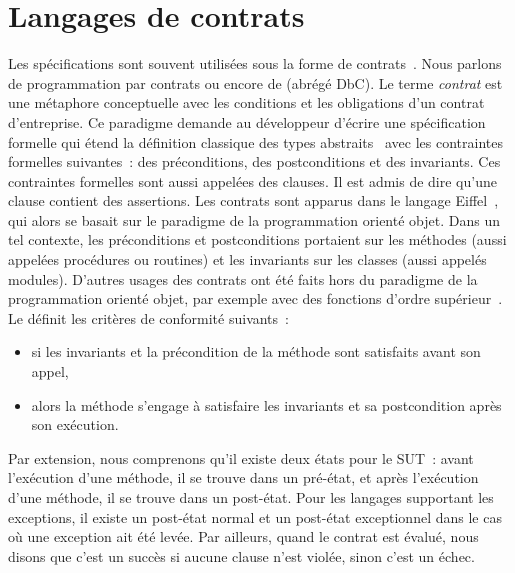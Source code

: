 \section{Langages de contrats}
\label{section:sota:bisl}

Les spécifications sont souvent utilisées sous la forme de {\strong
contrats}~. Nous parlons de programmation par contrats
ou encore de  (abrégé DbC). Le terme {\em contrat}
est une métaphore conceptuelle avec les conditions et les obligations d'un
contrat d'entreprise. Ce paradigme demande au développeur d'écrire une
spécification formelle qui étend la définition classique des types
abstraits~ avec les contraintes formelles suivantes~: des
{\strong préconditions}, des {\strong postconditions} et des {\strong
invariants}. Ces contraintes formelles sont aussi appelées des {\strong
clauses}. Il est admis de dire qu'une clause contient des {\strong assertions}.
Les contrats sont apparus dans le langage Eiffel~, qui alors se
basait sur le paradigme de la programmation orienté objet. Dans un tel contexte,
les préconditions et postconditions portaient sur les méthodes (aussi appelées
procédures ou routines) et les invariants sur les classes (aussi appelés
modules). D'autres usages des contrats ont été faits hors du paradigme de la
programmation orienté objet, par exemple avec des fonctions d'ordre
supérieur~. Le  définit les
critères de conformité suivants~:

\begin{itemize}

\item si les invariants et la précondition de la méthode sont satisfaits avant
son appel,

\item alors la méthode s'engage à satisfaire les invariants et sa postcondition
après son exécution.

\end{itemize}

Par extension, nous comprenons qu'il existe deux états pour le SUT~: avant
l'exécution d'une méthode, il se trouve dans un {\strong pré-état}, et après
l'exécution d'une méthode, il se trouve dans un {\strong post-état}. Pour les
langages supportant les exceptions, il existe un post-état normal et un
post-état exceptionnel dans le cas où une exception ait été levée. Par ailleurs,
quand le contrat est évalué, nous disons que c'est un {\strong succès} si aucune
clause n'est violée, sinon c'est un {\strong échec}.

